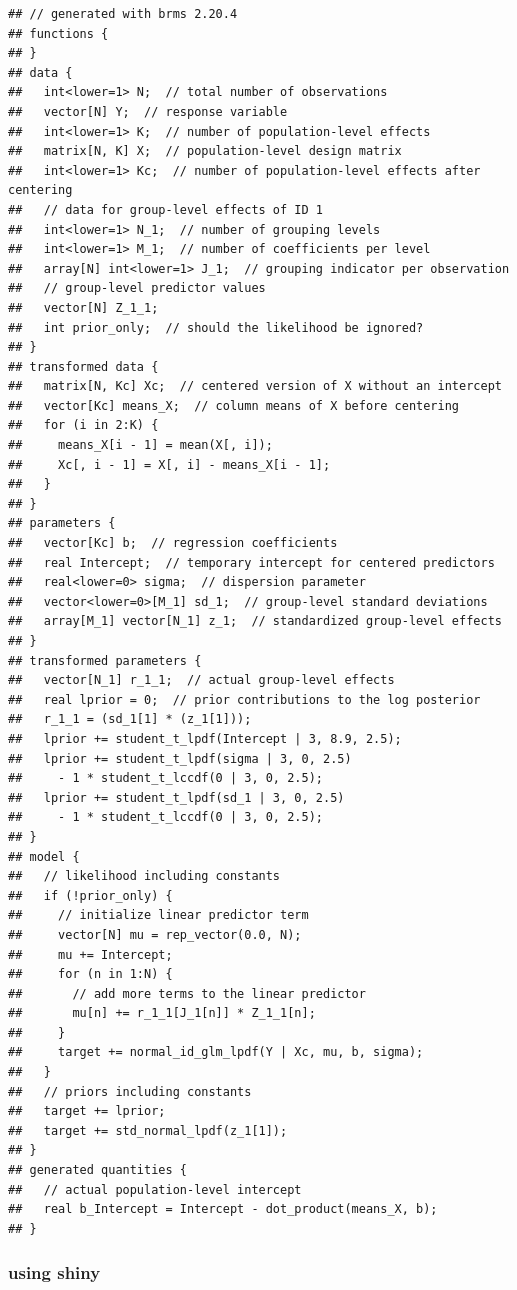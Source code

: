 \documentclass[
  12pt,
]{book}
\begin{document}
\begin{verbatim}
## // generated with brms 2.20.4
## functions {
## }
## data {
##   int<lower=1> N;  // total number of observations
##   vector[N] Y;  // response variable
##   int<lower=1> K;  // number of population-level effects
##   matrix[N, K] X;  // population-level design matrix
##   int<lower=1> Kc;  // number of population-level effects after centering
##   // data for group-level effects of ID 1
##   int<lower=1> N_1;  // number of grouping levels
##   int<lower=1> M_1;  // number of coefficients per level
##   array[N] int<lower=1> J_1;  // grouping indicator per observation
##   // group-level predictor values
##   vector[N] Z_1_1;
##   int prior_only;  // should the likelihood be ignored?
## }
## transformed data {
##   matrix[N, Kc] Xc;  // centered version of X without an intercept
##   vector[Kc] means_X;  // column means of X before centering
##   for (i in 2:K) {
##     means_X[i - 1] = mean(X[, i]);
##     Xc[, i - 1] = X[, i] - means_X[i - 1];
##   }
## }
## parameters {
##   vector[Kc] b;  // regression coefficients
##   real Intercept;  // temporary intercept for centered predictors
##   real<lower=0> sigma;  // dispersion parameter
##   vector<lower=0>[M_1] sd_1;  // group-level standard deviations
##   array[M_1] vector[N_1] z_1;  // standardized group-level effects
## }
## transformed parameters {
##   vector[N_1] r_1_1;  // actual group-level effects
##   real lprior = 0;  // prior contributions to the log posterior
##   r_1_1 = (sd_1[1] * (z_1[1]));
##   lprior += student_t_lpdf(Intercept | 3, 8.9, 2.5);
##   lprior += student_t_lpdf(sigma | 3, 0, 2.5)
##     - 1 * student_t_lccdf(0 | 3, 0, 2.5);
##   lprior += student_t_lpdf(sd_1 | 3, 0, 2.5)
##     - 1 * student_t_lccdf(0 | 3, 0, 2.5);
## }
## model {
##   // likelihood including constants
##   if (!prior_only) {
##     // initialize linear predictor term
##     vector[N] mu = rep_vector(0.0, N);
##     mu += Intercept;
##     for (n in 1:N) {
##       // add more terms to the linear predictor
##       mu[n] += r_1_1[J_1[n]] * Z_1_1[n];
##     }
##     target += normal_id_glm_lpdf(Y | Xc, mu, b, sigma);
##   }
##   // priors including constants
##   target += lprior;
##   target += std_normal_lpdf(z_1[1]);
## }
## generated quantities {
##   // actual population-level intercept
##   real b_Intercept = Intercept - dot_product(means_X, b);
## }
\end{verbatim}

\hypertarget{using-shiny}{%
\subsubsection{using shiny}\label{using-shiny}}
\end{document}

